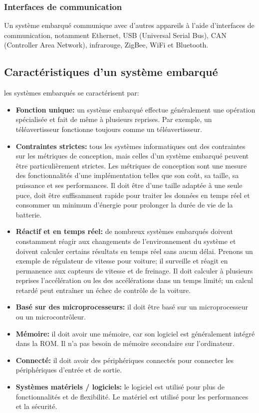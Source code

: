 \subsubsection{Interfaces de communication}
Un système embarqué communique avec d'autres appareils à l'aide d'interfaces de communication, notamment Ethernet, USB (Universal Serial Bus), CAN (Controller Area Network), infrarouge, ZigBee, WiFi et Bluetooth.

\subsection{Caractéristiques d'un système embarqué}
les systèmes embarqués se caractérisent par:
\begin{itemize}
    \item \textbf{Fonction unique:} un système embarqué effectue généralement une opération spécialisée et fait de même à plusieurs reprises. Par exemple, un téléavertisseur fonctionne toujours comme un téléavertisseur.
    
    
    \item \textbf{Contraintes strictes:} tous les systèmes informatiques ont des contraintes sur les métriques de conception, mais celles d'un système embarqué peuvent être particulièrement strictes. Les métriques de conception sont une mesure des fonctionnalités d'une implémentation telles que son coût, sa taille, sa puissance et ses performances. Il doit être d'une taille adaptée à une seule puce, doit être suffisamment rapide pour traiter les données en temps réel et consommer un minimum d'énergie pour prolonger la durée de vie de la batterie.
    \item \textbf{Réactif et en temps réel:} de nombreux systèmes embarqués doivent constamment réagir aux changements de l'environnement du système et doivent calculer certains résultats en temps réel sans aucun délai. Prenons un exemple de régulateur de vitesse pour voiture; il surveille et réagit en permanence aux capteurs de vitesse et de freinage. Il doit calculer à plusieurs reprises l'accélération ou les des accélérations dans un temps limité; un calcul retardé peut entraîner un échec de contrôle de la voiture.
    \item \textbf{Basé sur des microprocesseurs:} il doit être basé sur un microprocesseur ou un microcontrôleur.
    \item \textbf{Mémoire:} il doit avoir une mémoire, car son logiciel est généralement intégré dans la ROM. Il n'a pas besoin de mémoire secondaire sur l'ordinateur.
    \item \textbf{Connecté:} il doit avoir des périphériques connectés pour connecter les périphériques d'entrée et de sortie.
    \item \textbf{Systèmes matériels / logiciels:} le logiciel est utilisé pour plus de fonctionnalités et de flexibilité. Le matériel est utilisé pour les performances et la sécurité.
\end{itemize}
